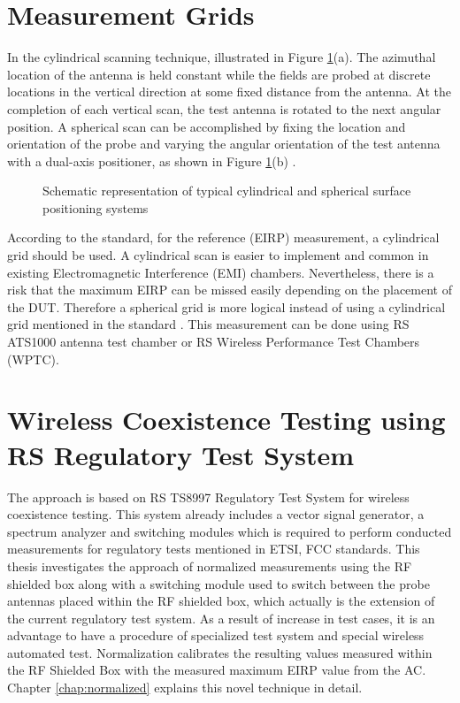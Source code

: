 \section{Measurement Grids}
In the cylindrical scanning technique, illustrated in Figure \ref{fig:cs}(a). The azimuthal location of the antenna is held constant while the fields are probed at discrete locations in the vertical direction at some fixed distance from the antenna. At the completion of each vertical scan, the test antenna is rotated to the next angular position. A spherical scan can be accomplished by fixing the location and orientation of the probe and varying the angular orientation of the test antenna with a dual-axis positioner, as shown in Figure \ref{fig:cs}(b) \cite{balanis}. 

\begin{figure}[H]
\centering
\caption{Schematic representation of typical cylindrical and spherical surface positioning systems \cite{balanis}}
\label{fig:cs}
\end{figure}

According to the standard, for the reference (\acs{EIRP}) measurement, a cylindrical grid should be used. A cylindrical scan is easier to implement and common in existing Electromagnetic Interference (EMI) chambers. Nevertheless, there is a risk that the maximum \acs{EIRP} can be missed easily depending on the placement of the \acs{DUT}. Therefore a spherical grid is more logical instead of using a cylindrical grid mentioned in the standard \cite{etsi300328}. This measurement can be done using \acs{RS} ATS1000 antenna test chamber or \acs{RS} Wireless Performance Test Chambers (WPTC).


\section{Wireless Coexistence Testing using \acs{RS}\textregistered{} Regulatory Test System}
The approach is based on \acs{RS}\textregistered{} TS8997 Regulatory Test System for wireless coexistence testing. This system already includes a vector signal generator, a spectrum analyzer and switching modules which is required to perform conducted measurements for regulatory tests mentioned in \acs{ETSI}, \acs{FCC} standards. This thesis investigates the approach of normalized measurements using the \acs{RF} shielded box along with a switching module used to switch between the probe antennas placed within the \acs{RF} shielded box, which actually is the extension of the current regulatory test system. As a result of increase in test cases, it is an advantage to have a procedure of specialized test system and special wireless automated test. Normalization calibrates the resulting values measured within the \acs{RF} Shielded Box with the measured maximum \acs{EIRP} value from the \acs{AC}. Chapter \ref{chap:normalized} explains this novel technique in detail.

